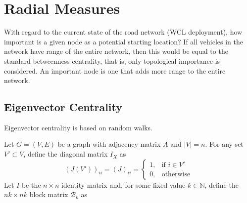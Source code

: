\documentclass[envcountsame]{llncs}
\begin{document}
	\section{Radial Measures}
     With regard to the current state of the road network (WCL deployment), how important is a given node as a potential starting location? If all vehicles in the network have range of the entire network, then this would be equal to the standard betweenness centrality, that is, only topological importance is considered. An important node is one that adds more range to the entire network. 

\subsection{Eigenvector Centrality}
Eigenvector centrality is based on random walks. 

Let $G=(V,E)$ be a graph with adjacency matrix $A$ and $|V|=n$. For any set $V' \subset V$, define the diagonal matrix $I_X$ as
\begin{equation*}
(J(V'))_{ii}= (J)_{ii} = \begin{cases}
1, & \text{if } i \in V' \\
0, & \text{otherwise} 
\end{cases}
\end{equation*}
Let $I$ be the $n\times n$ identity matrix and, for some fixed value $k \in \mathbb{N}$, define the $nk \times nk$  block matrix $\mathcal{B}_k$ as 
\end{document}
